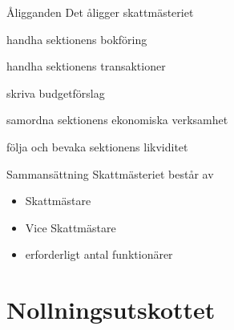 \documentclass[pdfbookmarks,a4paper,11pt]{article}
\newlength{\itemcollength}
\newenvironment{reglemlista}{%
  \begin{list}{}{%
      \setlength{\labelwidth}{\itemcollength}%
      \setlength{\leftmargin}{\labelwidth + \labelsep}%
      \renewcommand{\makelabel}[1]{%
        \raisebox{0pt}[1ex][0pt]{%
          \makebox[\labelwidth][l]{%
            \parbox[t]{\itemcollength}{%
              \raggedright\hspace{0pt}##1}}}\hfill}%
      }}{%
  \end{list}}
\begin{document}
\begin{reglemlista}

	\item[Åligganden]
	Det åligger skattmästeriet
	\begin{attlista}
		\item handha sektionens bokföring
		\item handha sektionens transaktioner
		\item skriva budgetförslag
		\item samordna sektionens ekonomiska verksamhet
		\item följa och bevaka sektionens likviditet
	\end{attlista}

	\item[Sammansättning]
	Skattmästeriet består av
	\begin{itemize}
		\item Skattmästare
		\item Vice Skattmästare
		\item erforderligt antal funktionärer
	\end{itemize}
\end{reglemlista}

\section{Nollningsutskottet}
\end{document}
